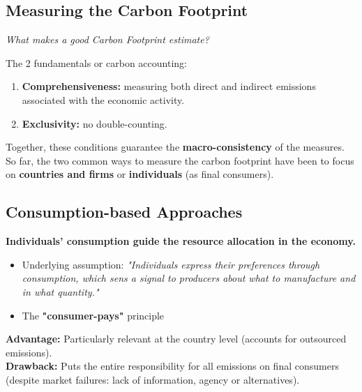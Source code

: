 \documentclass[10pt]{beamer}
\begin{document}
\subsection{Measuring the Carbon Footprint}
\begin{frame}{\subsecname}

    \textit{What makes a good Carbon Footprint estimate?}
    
    The 2 fundamentals or carbon accounting:
        \begin{enumerate}
            \item \textbf{Comprehensiveness:} measuring both direct and indirect emissions associated with the economic activity.
            \item \textbf{Exclusivity:} no double-counting.
        \end{enumerate}
    
    Together, these conditions guarantee the \textbf{macro-consistency} of the measures. \\
    So far, the two common ways to measure the carbon footprint have been to focus on \textbf{countries and firms} or \textbf{individuals} (as final consumers).
\end{frame}

\subsection{Consumption-based Approaches}
\begin{frame}{\subsecname}
    \textbf{Individuals' consumption guide the resource allocation in the economy.}
        \begin{itemize}
            \item Underlying assumption: \textit{"Individuals express their preferences through consumption, which sens a signal to producers about what to manufacture and in what quantity."}
            \item The \textbf{"consumer-pays"} principle
        \end{itemize}
        \textbf{Advantage:} Particularly relevant at the country level (accounts for outsourced emissions). \\
        \textbf{Drawback:} Puts the entire responsibility for all emissions on final consumers (despite market failures: lack of information, agency or alternatives).
\end{frame}
\end{document}
